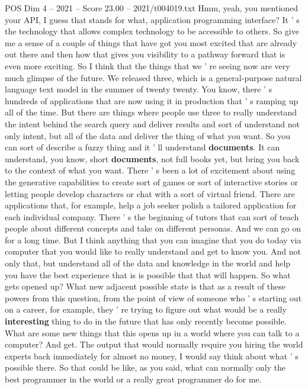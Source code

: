 \begin{textsample}{POS Dim 4 – 2021 – Score 23.00 – 2021/t004019.txt}
Hmm, yeah, you mentioned your API, I guess that stands for what, application programming interface?
It ' s the technology that allows complex technology to be accessible to others.
So give me a sense of a couple of things that have got you most excited that are already out there and then how that gives you visibility to a pathway forward that is even more exciting.
So I think that the things that we ' re seeing now are very much glimpse of the future.
We released three, which is a general-purpose natural language text model in the summer of twenty twenty.
You know, there ' s hundreds of applications that are now using it in production that ' s ramping up all of the time.
But there are things where people use three to really understand the intent behind the search query and deliver results and sort of understand not only intent, but all of the data and deliver the thing of what you want.
So you can sort of describe a fuzzy thing and it ' ll understand \textbf{documents}.
It can understand, you know, short \textbf{documents}, not full books yet, but bring you back to the context of what you want.
There ' s been a lot of excitement about using the generative capabilities to create sort of games or sort of interactive stories or letting people develop characters or chat with a sort of virtual friend.
There are applications that, for example, help a job seeker polish a tailored application for each individual company.
There ' s the beginning of tutors that can sort of teach people about different concepts and take on different personas.
And we can go on for a long time.
But I think anything that you can imagine that you do today via computer that you would like to really understand and get to know you.
And not only that, but understand all of the data and knowledge in the world and help you have the best experience that is is possible that that will happen.
So what gets opened up?
What new adjacent possible state is that as a result of these powers from this question, from the point of view of someone who ' s starting out on a career, for example, they ' re trying to figure out what would be a really \textbf{interesting} thing to do in the future that has only recently become possible.
What are some new things that this opens up in a world where you can talk to a computer?
And get.
The output that would normally require you hiring the world experts back immediately for almost no money, I would say think about what ' s possible there.
So that could be like, as you said, what can normally only the best programmer in the world or a really great programmer do for me.

\end{textsample}
